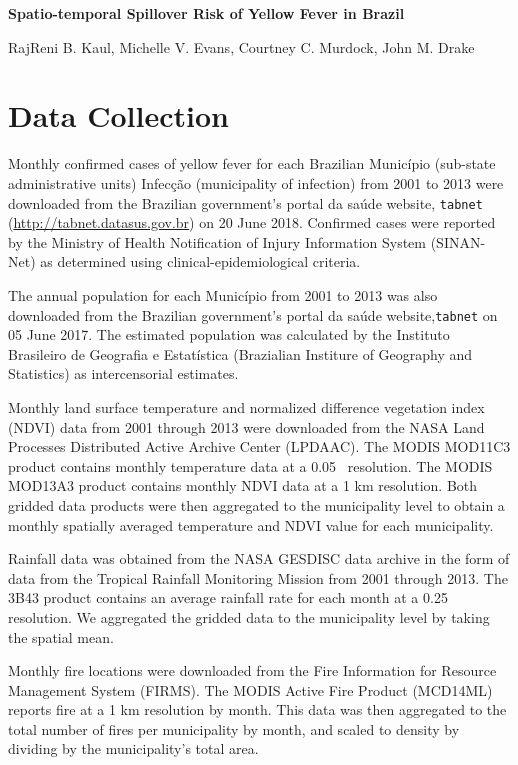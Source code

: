 \documentclass{article}
\begin{document}
\noindent
\textbf{\LARGE{Spatio-temporal Spillover Risk of Yellow Fever in Brazil}}

\bigskip
\noindent
RajReni B. Kaul, Michelle V. Evans, Courtney C. Murdock, John M. Drake
\smallskip

\tableofcontents

\newpage

\section{Data Collection}

Monthly confirmed cases of yellow fever for each Brazilian Munic\'{i}pio (sub-state administrative units) Infec\c{c}\~{a}o (municipality of infection) from 2001 to 2013 were downloaded from the Brazilian government's portal da sa\'{u}de website, \texttt{tabnet} (\url{http://tabnet.datasus.gov.br}) on 20 June 2018.
Confirmed cases were reported by the Ministry of Health Notification of Injury Information System (SINAN-Net) as determined using clinical-epidemiological criteria.

The annual population for each Munic\'{i}pio from 2001 to 2013 was also downloaded from the Brazilian government's portal da sa\'{u}de website,\texttt{tabnet} on 05 June 2017. The estimated population was calculated by the Instituto Brasileiro de Geografia e Estat\'{i}stica (Brazialian Institure of Geography and Statistics) as intercensorial estimates.

Monthly land surface temperature and normalized difference vegetation index (NDVI) data from 2001 through 2013 were downloaded from the NASA Land Processes Distributed Active Archive Center (LPDAAC). The MODIS MOD11C3 product contains monthly temperature data at a 0.05\degree~ resolution. The MODIS MOD13A3 product contains monthly NDVI data at a 1 km resolution. Both gridded data products were then aggregated to the municipality level to obtain a monthly spatially averaged temperature and NDVI value for each municipality.

Rainfall data was obtained from the NASA GESDISC data archive in the form of data from the Tropical Rainfall Monitoring Mission from 2001 through 2013. The 3B43 product contains an average rainfall rate for each month at a 0.25\degree~ resolution. We aggregated the gridded data to the municipality level by taking the spatial mean.

Monthly fire locations were downloaded from the Fire Information for Resource Management System (FIRMS). The MODIS Active Fire Product (MCD14ML) reports fire at a 1 km resolution by month. This data was then aggregated to the total number of fires per municipality by month, and scaled to density by dividing by the municipality's total area.
\end{document}
